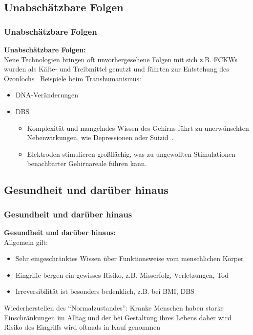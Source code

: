 \documentclass[aspectratio=169,16pt,xcolor=table]{beamer}
\begin{document}
\subsection*{Unabschätzbare Folgen}
\begin{frame}
  \frametitle{Unabschätzbare Folgen}
  \textbf{Unabschätzbare Folgen:}\\
  \small Neue Technologien bringen oft unvorhergesehene Folgen mit sich z.B. FCKWs wurden als Kälte- und Treibmittel genutzt und führten zur Entstehung des Ozonlochs~\cite{rowland1996stratospheric}
  Beispiele beim Transhumanismus:
  \begin{itemize}
    \item DNA-Veränderungen
    
    \item DBS
    \begin{itemize}
      \item Komplexität und mangelndes Wissen des Gehirns führt zu unerwünschten Nebenwirkungen, wie Depressionen oder Suizid~\cite{zarzycki2020stimulation}.
      \item Elektroden stimulieren großflächig, was zu ungewollten Stimulationen benachbarter Gehirnareale führen kann.
    \end{itemize}
  \end{itemize}
\end{frame}

\subsection*{Gesundheit und darüber hinaus}
\begin{frame}
  \frametitle{Gesundheit und darüber hinaus}
  \textbf{Gesundheit und darüber hinaus:}\\
  Allgemein gilt:
  \begin{itemize}
      \item Sehr eingeschränktes Wissen über Funktionsweise vom menschlichen Körper
      \item Eingriffe bergen ein gewisses Risiko, z.B. Misserfolg, Verletzungen, Tod
      \item Irreversibilität ist besonders bedenklich, z.B. bei BMI, DBS
  \end{itemize}
  Wiederherstellen des ``Normalzustandes'':
  Kranke Menschen haben starke Einschränkungen im Alltag und der bei Gestaltung ihres Lebens daher wird Risiko des Eingriffs wird oftmals in Kauf genommen
\end{frame}
\end{document}
